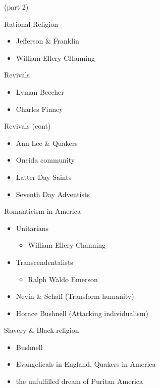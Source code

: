 \begin{frame}[label=sec-2-10]{(part 2)}
\begin{block}{Rational Religion}
\begin{itemize}
\item Jefferson \& Franklin
\item William Ellery CHanning
\end{itemize}
\end{block}

\begin{block}{Revivals}
\begin{itemize}
\item Lyman Beecher
\item Charles Finney
\end{itemize}
\end{block}
\begin{block}{Revivals (cont)}
\begin{itemize}
\item Ann Lee \& Quakers
\item Oneida community
\item Latter Day Saints
\item Seventh Day Adventists
\end{itemize}
\end{block}

\begin{block}{Romanticism in America}
\begin{itemize}
\item Unitarians
\begin{itemize}
\item William Ellery Channing
\end{itemize}
\item Transcendentalists
\begin{itemize}
\item Ralph Waldo Emerson
\end{itemize}
\item Nevin \& Schaff (Transform humanity)
\item Horace Bushnell (Attacking individualism)
\end{itemize}
\end{block}

\begin{block}{Slavery \& Black religion}
\begin{itemize}
\item Bushnell
\item Evangelicals in England, Quakers in America
\item the unfulfilled dream of Puritan America
\end{itemize}
\end{block}
\end{frame}

